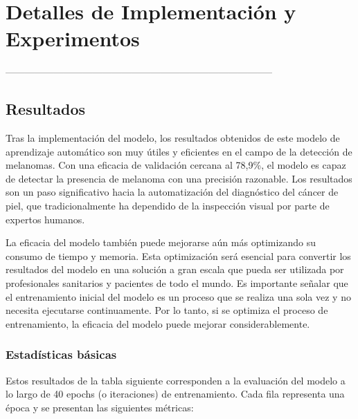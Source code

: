 \chapter{Detalles de Implementación y Experimentos}\label{chapter:implementation}

-----------------------------------------------------------------------------------
\section{Resultados}\label{sec:results}
Tras la implementación del modelo, los resultados obtenidos de este modelo de aprendizaje automático son muy útiles y eficientes en el campo de la detección de melanomas. 
Con una eficacia de validación cercana al 78,9\%, el modelo es capaz de detectar la presencia de melanoma con una precisión razonable. 
Los resultados son un paso significativo hacia la automatización del diagnóstico del cáncer de piel, que tradicionalmente ha dependido de la inspección visual por parte de expertos humanos.

La eficacia del modelo también puede mejorarse aún más optimizando su consumo de tiempo y memoria. 
Esta optimización será esencial para convertir los resultados del modelo en una solución a gran escala que pueda ser utilizada por profesionales sanitarios y pacientes de todo el mundo. 
Es importante señalar que el entrenamiento inicial del modelo es un proceso que se realiza una sola vez y no necesita ejecutarse continuamente. 
Por lo tanto, si se optimiza el proceso de entrenamiento, la eficacia del modelo puede mejorar considerablemente.

	\subsection{Estadísticas básicas}\label{sub:basic_statistics}
    
    Estos resultados de la tabla siguiente corresponden a la evaluación del modelo a lo largo de 40 epochs (o iteraciones) de entrenamiento. Cada fila representa una época y se presentan las siguientes métricas:
    
